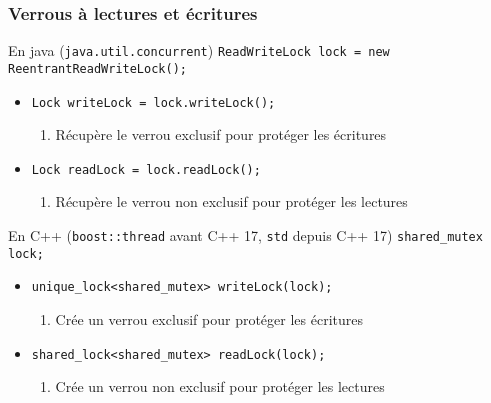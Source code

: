 
\begingroup

\begin{frame}[fragile]
  \frametitle{Verrous à lectures et écritures}
  \vfill
  \begin{block}{En java (\lstinline{java.util.concurrent})}
    \lstinline{ReadWriteLock lock = new ReentrantReadWriteLock();}
    \begin{itemize}
    \item \lstinline{Lock writeLock = lock.writeLock();}
      \begin{enumerate}
      \item Récupère le verrou \alert{exclusif} pour protéger les écritures
      \end{enumerate}
    \item \lstinline{Lock readLock = lock.readLock();}
      \begin{enumerate}
      \item Récupère le verrou \alert{non exclusif} pour protéger les lectures
      \end{enumerate}
    \end{itemize}
  \end{block}

  \vfill
  \begin{block}{En C++ (\lstinline{boost::thread} avant C++ 17, \lstinline{std} depuis C++ 17)}
    \lstinline{shared_mutex lock;} 
    \begin{itemize}
    \item \lstinline{unique_lock<shared_mutex> writeLock(lock);}
      \begin{enumerate}
      \item Crée un verrou \alert{exclusif} pour protéger les écritures
      \end{enumerate}
    \item \lstinline{shared_lock<shared_mutex> readLock(lock);}
      \begin{enumerate}
      \item Crée un verrou \alert{non exclusif} pour protéger les lectures
      \end{enumerate}
    \end{itemize}
  \end{block}
  \vfill
\end{frame}

\endgroup
\endinput

